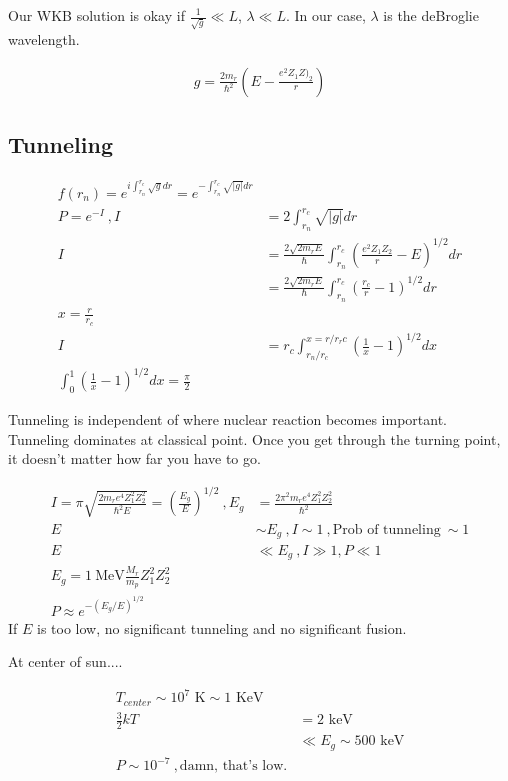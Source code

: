 \documentclass[10pt,letterpaper,final]{book}
\begin{document}
Our WKB solution is okay if $\frac{1}{\sqrt{g}} \ll L$, $\lambda \ll L$. In our case, $\lambda$ is the deBroglie wavelength. 

\begin{align}
g = \frac{2m_r}{\hbar^2} \left( E - \frac{e^2 Z_1 Z)_2}{r}\right)
\end{align}


\subsection{Tunneling}

\begin{align}
f(r_n) = e^{i \int_{r_n}^{r_c} \sqrt{g} dr} = e^{-\int_{r_n}^{r_c} \sqrt{|g|}dr}\\
P = e^{-I}~, I &= 2\int_{r_n}^{r_c} \sqrt{|g|}dr\\
I &= \frac{2\sqrt{2m_rE}}{\hbar} \int_{r_n}^{r_c} \left(  \frac{e^2 Z_1 Z_2}{r} -E \right)^{1/2} dr\\
& = \frac{2\sqrt{2m_rE}}{\hbar}    \int_{r_n}^{r_c} \left( \frac{r_c}{r} -1 \right)^{1/2}dr\\
x = \frac{r}{r_c}\\
I & = r_c \int_{r_n/r_c}^{x=r/r_rc} \left(\frac{1}{x}-1\right)^{1/2}dx\\
\int_0^1 \left(\frac{1}{x}-1\right)^{1/2}dx = \frac{\pi}{2}
\end{align}

Tunneling is independent of where nuclear reaction becomes important. Tunneling dominates at classical point. Once you get through the turning point, it doesn't matter how far you have to go. 

\begin{align}
I = \pi \sqrt{ \frac{2m_r e^4 Z_1^2 Z_2^2}{\hbar^2 E} } = \left(\frac{E_g}{E} \right)^{1/2}~, E_g &= \frac{2\pi^2 m_r e^4 Z_1^2 Z_2^2}{\hbar^2}\\
E &\sim E_g~, I \sim 1~,\text{Prob of tunneling}~ \sim 1\\
E& \ll E_g~, I \gg 1, P \ll 1\\
E_g = 1 ~\text{MeV} \frac{M_r}{m_p}Z_1^2 Z_2^2\\
P \approx e^{-(E_g/E)^{1/2}}
\end{align}
If $E$ is too low, no significant tunneling and no significant fusion.

At center of sun....

\begin{align}
T_{center} \sim 10^7 \text{ K} \sim 1 \text{ KeV}\\
\frac{3}{2}kT &= 2\text{ keV}\\
& \ll E_g \sim 500 \text{ keV}\\
P \sim 10^{-7}~,\text{damn, that's low.}
\end{align} 
\end{document}
